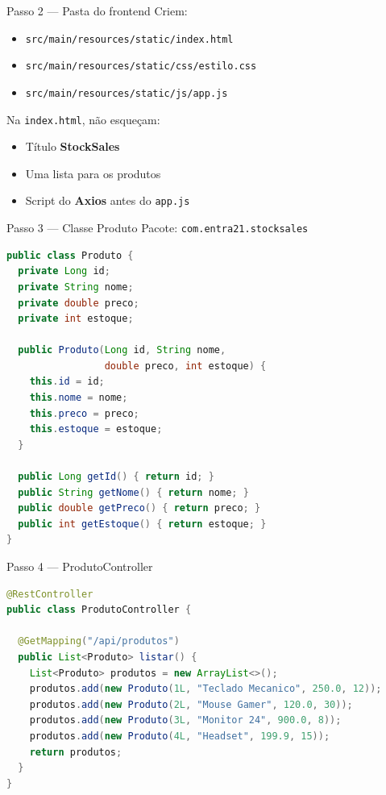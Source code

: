 \documentclass[aspectratio=169,11pt]{beamer}
\begin{document}
\begin{frame}{Passo 2 --- Pasta do frontend}
  Criem:

  \vspace{0.5em}
  \begin{itemize}
    \item \texttt{src/main/resources/static/index.html}
    \item \texttt{src/main/resources/static/css/estilo.css}
    \item \texttt{src/main/resources/static/js/app.js}
  \end{itemize}

  \vspace{0.5em}
  Na \texttt{index.html}, não esqueçam:
  \begin{itemize}
    \item Título \textbf{StockSales}
    \item Uma lista para os produtos
    \item Script do \textbf{Axios} antes do \texttt{app.js}
  \end{itemize}
\end{frame}

\begin{frame}[fragile]{Passo 3 --- Classe Produto}
  Pacote: \texttt{com.entra21.stocksales}

\begin{lstlisting}[language=Java,basicstyle=\ttfamily\footnotesize]
public class Produto {
  private Long id;
  private String nome;
  private double preco;
  private int estoque;

  public Produto(Long id, String nome,
                 double preco, int estoque) {
    this.id = id;
    this.nome = nome;
    this.preco = preco;
    this.estoque = estoque;
  }

  public Long getId() { return id; }
  public String getNome() { return nome; }
  public double getPreco() { return preco; }
  public int getEstoque() { return estoque; }
}
\end{lstlisting}
\end{frame}

\begin{frame}[fragile]{Passo 4 --- ProdutoController}
\begin{lstlisting}[language=Java,basicstyle=\ttfamily\footnotesize]
@RestController
public class ProdutoController {

  @GetMapping("/api/produtos")
  public List<Produto> listar() {
    List<Produto> produtos = new ArrayList<>();
    produtos.add(new Produto(1L, "Teclado Mecanico", 250.0, 12));
    produtos.add(new Produto(2L, "Mouse Gamer", 120.0, 30));
    produtos.add(new Produto(3L, "Monitor 24", 900.0, 8));
    produtos.add(new Produto(4L, "Headset", 199.9, 15));
    return produtos;
  }
}
\end{lstlisting}
\end{frame}
\end{document}
